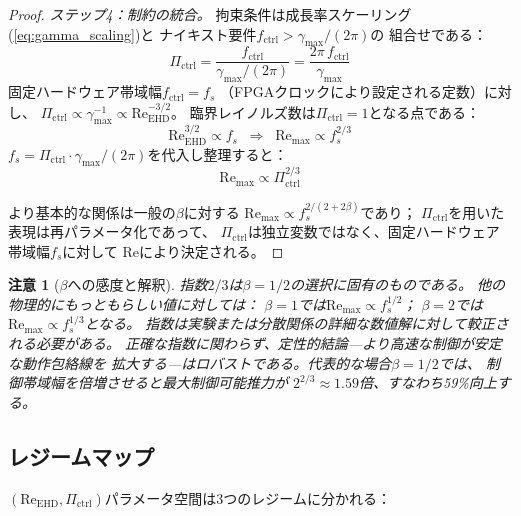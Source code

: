 \documentclass[12pt,twocolumn]{ltjsarticle}
\newtheorem{remark}{注意}
\newcommand{\Reehd}{\mathrm{Re}_{\mathrm{EHD}}}
\newcommand{\Pctrl}{\Pi_{\mathrm{ctrl}}}
\begin{document}
\begin{proof}
\textit{ステップ4：制約の統合。}
拘束条件は成長率スケーリング(\ref{eq:gamma_scaling})と
ナイキスト要件$f_{\mathrm{ctrl}} > \gamma_{\max}/(2\pi)$の
組合せである：
\begin{equation}
  \Pctrl = \frac{f_{\mathrm{ctrl}}}{\gamma_{\max}/(2\pi)}
  = \frac{2\pi\,f_{\mathrm{ctrl}}}{\gamma_{\max}}
  \label{eq:Pctrl_def_again}
\end{equation}
固定ハードウェア帯域幅$f_{\mathrm{ctrl}} = f_s$
（FPGAクロックにより設定される定数）に対し、
$\Pctrl \propto \gamma_{\max}^{-1} \propto \Reehd^{-3/2}$。
臨界レイノルズ数は$\Pctrl = 1$となる点である：
\begin{equation}
  \Reehd^{3/2} \propto f_s
  \;\;\Longrightarrow\;\;
  \mathrm{Re}_{\max} \propto f_s^{2/3}
  \label{eq:Remax_fs}
\end{equation}
$f_s = \Pctrl \cdot \gamma_{\max}/(2\pi)$を代入し整理すると：
\begin{equation}
  \mathrm{Re}_{\max} \propto \Pctrl^{2/3}
  \label{eq:Remax_Pctrl}
\end{equation}

より基本的な関係は一般の$\beta$に対する
$\mathrm{Re}_{\max} \propto f_s^{2/(2+2\beta)}$であり；
$\Pctrl$を用いた表現は再パラメータ化であって、
$\Pctrl$は独立変数ではなく、固定ハードウェア帯域幅$f_s$に対して
$\mathrm{Re}$により決定される。
\end{proof}

\begin{remark}[$\beta$への感度と解釈]
\label{rem:scaling_interp}
指数$2/3$は$\beta = 1/2$の選択に固有のものである。
他の物理的にもっともらしい値に対しては：
$\beta = 1$では$\mathrm{Re}_{\max} \propto f_s^{1/2}$；
$\beta = 2$では$\mathrm{Re}_{\max} \propto f_s^{1/3}$となる。
指数は実験または分散関係の詳細な数値解に対して較正される必要がある。
正確な指数に関わらず、定性的結論---より高速な制御が安定な動作包絡線を
拡大する---はロバストである。代表的な場合$\beta = 1/2$では、
制御帯域幅を倍増させると最大制御可能推力が
$2^{2/3} \approx 1.59$倍、すなわち59\%向上する。
\end{remark}

\subsection{レジームマップ}
\label{sec:numerical:regimes}

$(\Reehd, \Pctrl)$パラメータ空間は3つのレジームに分かれる：
\end{document}
